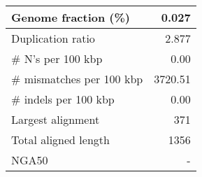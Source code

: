 \documentclass[12pt,a4paper]{article}
\begin{document}
\begin{table}[ht]
\begin{center}
\begin{tabular}{|l*{1}{|r}|}
Genome fraction (\%) & 0.027 \\ \hline
Duplication ratio & 2.877 \\ \hline
\# N's per 100 kbp & 0.00 \\ \hline
\# mismatches per 100 kbp & 3720.51 \\ \hline
\# indels per 100 kbp & 0.00 \\ \hline
Largest alignment & 371 \\ \hline
Total aligned length & 1356 \\ \hline
NGA50 & - \\ \hline
\end{tabular}
\end{center}
\end{table}
\end{document}
